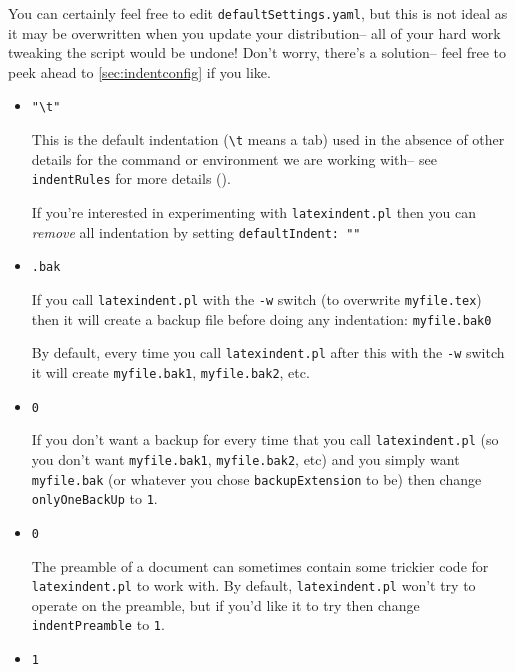 You can certainly feel free to edit \lstinline!defaultSettings.yaml!, but 
this is not ideal as it may be overwritten when you update your distribution--
all of your hard work tweaking the script would be undone! Don't worry, 
there's a solution-- feel free to peek ahead to \cref{sec:indentconfig} if you like.
\begin{itemize}
	\item[\verbitem{defaultIndent}] \lstinline!"\t"!
													 		 		 		 		 					
	This is the default indentation (\lstinline!\t! means a tab) used in the absence of other details 
	for the command or environment we are working with-- see \lstinline!indentRules!
	for more details ().
													 		 		 		 		 					
	If you're interested in experimenting with \lstinline!latexindent.pl! then you 
	can \emph{remove} all indentation by setting \lstinline!defaultIndent: ""!
	\item[\verbitem{backupExtension}] \lstinline!.bak!
													 		 		 		 		 					
	If you call \lstinline!latexindent.pl! with the \lstinline!-w! switch (to overwrite
	\lstinline!myfile.tex!) then it will create a backup file before doing 
	any indentation: \lstinline!myfile.bak0! 
													 		 		 		 		 					
	By default, every time you call \lstinline!latexindent.pl! after this with 
	the \lstinline!-w! switch it will create \lstinline!myfile.bak1!, \lstinline!myfile.bak2!, 
	etc.
	\item[\verbitem{onlyOneBackUp}] \lstinline!0!
													 		 		 		 		 					
	\label{page:onlyonebackup}
	If you don't want a backup for every time that you call \lstinline!latexindent.pl! (so 
	you don't want \lstinline!myfile.bak1!, \lstinline!myfile.bak2!, etc) and you simply
	want \lstinline!myfile.bak! (or whatever you chose \lstinline!backupExtension! to be)
	then change \lstinline!onlyOneBackUp! to \lstinline!1!.
	\item[\verbitem{indentPreamble}] \lstinline!0!
													 		 		 		 		 					
	The preamble of a document can sometimes contain some trickier code 
	for \lstinline!latexindent.pl! to work with. By default, \lstinline!latexindent.pl!
	won't try to operate on the preamble, but if you'd like it to try then 
	change \lstinline!indentPreamble! to \lstinline!1!.
	\item[\verbitem{alwaysLookforSplitBraces}] \lstinline!1!
													 		 		 		 		 					

\end{itemize}
